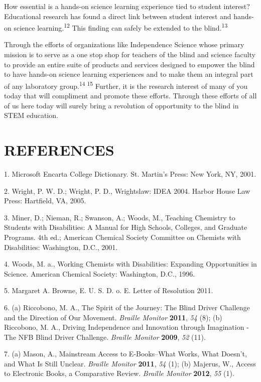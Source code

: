 \documentclass[11.5pt]{sig-alternate} %
\begin{document}
\begin{large}
How essential is a hands-on science learning experience tied to student interest? Educational research has found a direct link between student interest and hands-on science learning.\textsuperscript{12} This finding can safely be extended to the blind.\textsuperscript{13}

Through the efforts of organizations like Independence Science whose primary mission is to serve as a one stop shop for teachers of the blind and science faculty to provide an entire suite of products and services designed to empower the blind to have hands-on science learning experiences and to make them an integral part of any laboratory group.\textsuperscript{14 15} Further, it is the research interest of many of you today that will compliment and promote these efforts. Through these efforts of all of us here today will surely bring a revolution of opportunity to the blind in STEM education.

\end{large}
\clearpage
\section*{REFERENCES}\par 

\leftskip 0.25in
\parindent -0.25in 
1. Microsoft Encarta College Dictionary. St. Martin’s Press: New York, NY, 2001.

2. Wright, P. W. D.; Wright, P. D., Wrightslaw: IDEA 2004. Harbor House Law Press: Hartfield, VA, 2005.

3. Miner, D.; Nieman, R.; Swanson, A.; Woods, M., Teaching Chemistry to Students with Disabilities: A Manual for High Schools, Colleges, and Graduate Programs. 4th ed.; American Chemical Society Committee on Chemists with Disabilities: Washington, D.C., 2001.

4. Woods, M. a., Working Chemists with Disabilities: Expanding Opportunities in Science. American Chemical Society: Washington, D.C., 1996.

5. Margaret A. Browne, E. U. S. D. o. E. Letter of Resolution 2011. 

6. (a) Riccobono, M. A., The Spirit of the Journey: The Blind Driver Challenge and the Direction of Our Movement. \textit{Braille Monitor} \textbf{2011}, \textit{54} (8); (b) Riccobono, M. A., Driving Independence and Innovation through Imagination - The NFB Blind Driver Challenge. \textit{Braille Monitor} \textbf{2009}, \textit{52} (11).

7. (a) Mason, A., Mainstream Access to E-Books--What Works, What Doesn’t, and What Is Still Unclear. \textit{Braille Monitor} \textbf{2011}, \textit{54} (1); (b) Majerus, W., Access to Electronic Books, a Comparative Review. \textit{Braille Monitor} \textbf{2012}, \textit{55} (1).
\end{document}
